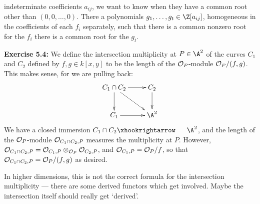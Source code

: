 \documentclass[11pt]{article}
\begin{document}
\begin{I.5 Nonsingular Varieties}
\begin{itemise}
indeterminate coefficients $a_{ij}$, we want to know when they have a common
root other than $(0,0,\ldots,0)$. There a polynomials
$g_1,\ldots,g_t\in\Z[a_{ij}]$, homogeneous in the coefficients of each $f_i$
separately, such that there is a common nonzero root for the $f_i$ \Iff there is
a common root for the $g_t$.
\item \textbf{Exercise 5.4:} We define the intersection multiplicity at
$P\in\A^2$ of the curves $C_1$ and $C_2$ defined by $f,g\in k[x,y]$ to be the
length of the $\mathcal{O}_P$-module $\mathcal{O}_P/(f,g)$. This makes sense, for we are
pulling back:
\[\xymatrix{
C_1\cap C_2\ar[r]\ar[d]\ar[rd]&C_2\ar[d]\\
C_1\ar[r]&\A^2
}\]
We have a closed immersion $C_1\cap C_2\cofibration \A^2$, and the length of the
$\mathcal{O}_P$-module $\mathcal{O}_{C_1\cap C_2,P}$ measures the multiplicity at $P$.
However, $\mathcal{O}_{C_1\cap C_2,P}=\mathcal{O}_{C_1,P}\otimes_{\mathcal{O}_P}\mathcal{O}_{C_2,P}$,
and $\mathcal{O}_{C_1,P}=\mathcal{O}_P/f$, so that $\mathcal{O}_{C_1\cap C_2,P}=\mathcal{O}_P/(f,g)$ as
desired.

\INDENT In higher dimensions, this is not the correct formula for the
intersection multiplicity --- there are some derived functors which get
involved. Maybe the intersection itself should really get `derived'.
\end{itemise}
\end{I.5 Nonsingular Varieties}
\end{document}
